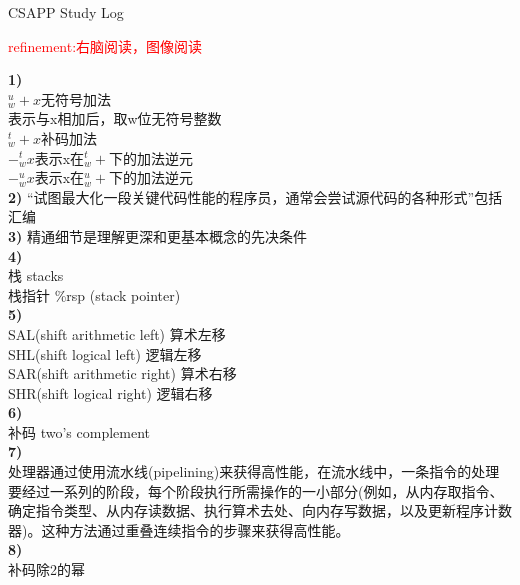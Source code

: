 \documentclass{article}
\newcommand{\red}[1]{\textcolor{red}{#1}}
\begin{document}
\begin{CJK}{UTF8}{gkai}
\end{CJK}
\begin{CJK}{UTF8}{gbsn}
\end{CJK}
\begin{CJK}{UTF8}{uyhei}
\fontsize{40pt}{40pt}\selectfont
\centerline{CSAPP Study Log}			
\fontsize{25pt}{25pt}\selectfont
\centerline{\red{refinement:右脑阅读，图像阅读}}	
\fontsize{18pt}{18pt}\selectfont
\noindent\textbf{1)}			\\
$_w^u+x$无符号加法			\\[0.5ex]
表示与x相加后，取w位无符号整数		\\[0.5ex]
$_w^t+x$补码加法			\\[0.5ex]
$-_w^tx$表示x在$^t_w+$下的加法逆元	\\[0.5ex]
$-_w^ux$表示x在$_w^u+$下的加法逆元	\\[1ex]
\textbf{2)}
``试图最大化一段关键代码性能的程序员，通常会尝试源代码的各种形式''包括汇编	\\[1ex]
\textbf{3)}
精通细节是理解更深和更基本概念的先决条件	\\[1ex]
\textbf{4)}	\\
栈	stacks	\\[1ex]
栈指针	\%rsp	(stack pointer)	\\[1ex]
\textbf{5)}	\\
SAL(shift arithmetic left)	算术左移	\\
SHL(shift logical left)		逻辑左移	\\
SAR(shift arithmetic right)	算术右移	\\
SHR(shift logical right)	逻辑右移	\\[1ex]
\textbf{6)}	\\
补码	two's complement	\\
\textbf{7)}	\\
处理器通过使用流水线(pipelining)来获得高性能，在流水线中，一条指令的处理要经过一系列的阶段，每个阶段执行所需操作的一小部分(例如，从内存取指令、确定指令类型、从内存读数据、执行算术去处、向内存写数据，以及更新程序计数器)。这种方法通过重叠连续指令的步骤来获得高性能。	\\[1ex]
\textbf{8)}	\\
补码除2的幂	\\

\end{CJK}
\end{document}
